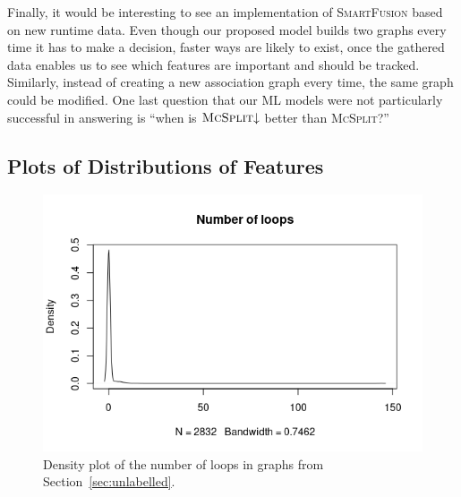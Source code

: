 \documentclass{l4proj}
\theoremstyle{definition}
\theoremstyle{remark}
\begin{document}
Finally, it would be interesting to see an implementation of
\textsc{SmartFusion} based on new runtime data. Even though our proposed model
builds two graphs every time it has to make a decision, faster ways are likely
to exist, once the gathered data enables us to see which features are important
and should be tracked. Similarly, instead of creating a new association graph
every time, the same graph could be modified. One last question that our ML
models were not particularly successful in answering is ``when is
$\textsc{McSplit}{\downarrow}$ better than \textsc{McSplit}?''

\begin{appendices}

  \chapter{Plots of Distributions of Features} \label{appendix:plots}

  \begin{figure}
    \centering
    \includegraphics[scale=0.7]{images/sip_loops.png}
    \caption{Density plot of the number of loops in graphs from
      Section~\ref{sec:unlabelled}.}
    \label{fig:loops}
  \end{figure}


\end{appendices}
\end{document}
